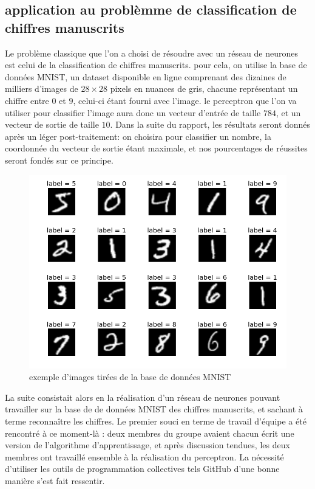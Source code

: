 \documentclass[
    10pt,
    a4paper,
    oneside,
    headinclude,footinclude,
    BCOR=5mm,
    captions=tableabove
]{scrartcl}
\begin{document}
\subsection{application au problèmme de classification de chiffres manuscrits}

Le problème classique que l'on a choisi de résoudre avec un réseau de neurones est celui de la classification de chiffres manuscrits. pour cela, on utilise la base de données MNIST, un dataset disponible en ligne comprenant des dizaines de milliers d'images de $28\times 28$ pixels en nuances de gris, chacune représentant un chiffre entre $0$ et $9$, celui-ci étant fourni avec l'image. le perceptron que l'on va utiliser pour classifier l'image aura donc un vecteur d'entrée de taille $784$, et un vecteur de sortie de taille $10$. Dans la suite du rapport, les résultats seront donnés après un léger post-traitement: on choisira pour classifier un nombre, la coordonnée du vecteur de sortie étant maximale, et nos pourcentages de réussites seront fondés sur ce principe.

\begin{figure}[h!]
\includegraphics[width=0.8 \linewidth]{MNIST.png}
\centering
 \caption{exemple d'images tirées de la base de données MNIST}
 \label{fig:MNIST}
\end{figure}

La suite consistait alors en la réalisation d'un réseau de neurones pouvant travailler sur la base de de données MNIST des chiffres manuscrits, et sachant à terme reconnaître les chiffres. Le premier souci en terme de travail d'équipe a été rencontré à ce moment-là : deux membres du groupe avaient chacun écrit une version de l'algorithme d'apprentissage, et après discussion tendues, les deux membres ont travaillé ensemble à la réalisation du perceptron. La nécessité d'utiliser les outils de programmation collectives tels GitHub d'une bonne manière s'est fait ressentir.
\end{document}
